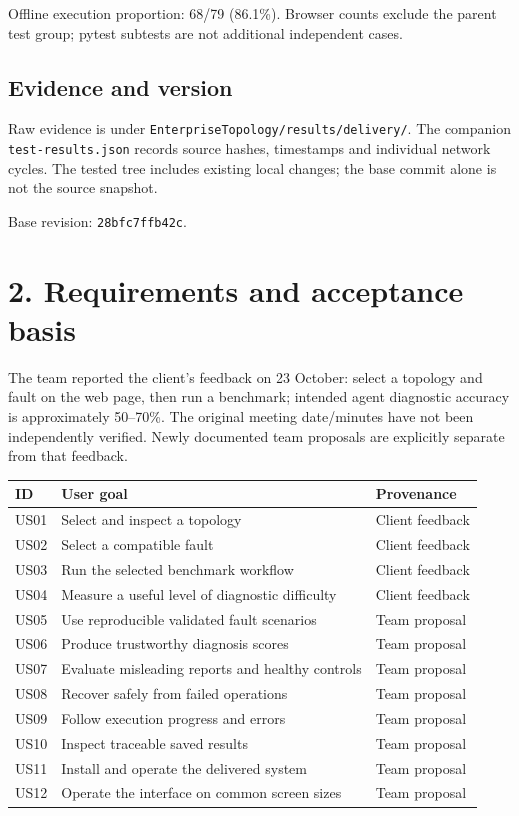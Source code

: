 \documentclass[10pt,a4paper]{article}
\begin{document}
Offline execution proportion: 68/79 (86.1\%). Browser counts exclude the parent test group; pytest subtests are not additional independent cases.


\subsection*{Evidence and version}
Raw evidence is under \texttt{EnterpriseTopology/results/delivery/}. The companion \texttt{test-results.json} records source hashes, timestamps and individual network cycles. The tested tree includes existing local changes; the base commit alone is not the source snapshot.

Base revision: \texttt{28bfc7ffb42c}.

\newpage
\section*{2. Requirements and acceptance basis}
The team reported the client's feedback on 23 October: select a topology and fault on the web page, then run a benchmark; intended agent diagnostic accuracy is approximately 50--70\%. The original meeting date/minutes have not been independently verified. Newly documented team proposals are explicitly separate from that feedback.

\begin{tabularx}{\textwidth}{@{}lXl@{}}\toprule
ID & User goal & Provenance \\
\midrule
US01 & Select and inspect a topology & Client feedback \\
US02 & Select a compatible fault & Client feedback \\
US03 & Run the selected benchmark workflow & Client feedback \\
US04 & Measure a useful level of diagnostic difficulty & Client feedback \\
US05 & Use reproducible validated fault scenarios & Team proposal \\
US06 & Produce trustworthy diagnosis scores & Team proposal \\
US07 & Evaluate misleading reports and healthy controls & Team proposal \\
US08 & Recover safely from failed operations & Team proposal \\
US09 & Follow execution progress and errors & Team proposal \\
US10 & Inspect traceable saved results & Team proposal \\
US11 & Install and operate the delivered system & Team proposal \\
US12 & Operate the interface on common screen sizes & Team proposal \\
\bottomrule\end{tabularx}
\end{document}
